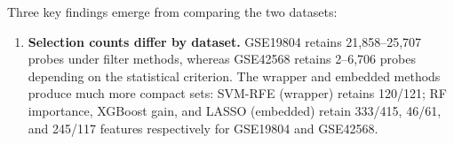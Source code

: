 Three key findings emerge from comparing the two datasets:

\begin{enumerate}
    \item \textbf{Selection counts differ by dataset.} GSE19804 retains 21,858--25,707 probes under filter methods, whereas GSE42568 retains 2--6,706 probes depending on the statistical criterion. The wrapper and embedded methods produce much more compact sets: SVM-RFE (wrapper) retains 120/121; RF importance, XGBoost gain, and LASSO (embedded) retain 333/415, 46/61, and 245/117 features respectively for GSE19804 and GSE42568.
\end{enumerate}